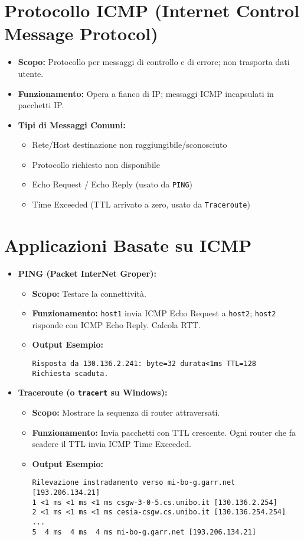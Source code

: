 \section{Protocollo ICMP (Internet Control Message Protocol)}
\begin{itemize}
    \item \textbf{Scopo:} Protocollo per messaggi di controllo e di errore; non trasporta dati utente.
    \item \textbf{Funzionamento:} Opera a fianco di IP; messaggi ICMP incapsulati in pacchetti IP.
    \item \textbf{Tipi di Messaggi Comuni:}
    \begin{itemize}
        \item Rete/Host destinazione non raggiungibile/sconosciuto
        \item Protocollo richiesto non disponibile
        \item Echo Request / Echo Reply (usato da \texttt{PING})
        \item Time Exceeded (TTL arrivato a zero, usato da \texttt{Traceroute})
    \end{itemize}
\end{itemize}

\section{Applicazioni Basate su ICMP}
\begin{itemize}
    \item \textbf{PING (Packet InterNet Groper):}
    \begin{itemize}
        \item \textbf{Scopo:} Testare la connettività.
        \item \textbf{Funzionamento:} \texttt{host1} invia ICMP Echo Request a \texttt{host2}; \texttt{host2} risponde con ICMP Echo Reply. Calcola RTT.
        \item \textbf{Output Esempio:}
\begin{verbatim}
Risposta da 130.136.2.241: byte=32 durata<1ms TTL=128
Richiesta scaduta.
\end{verbatim}
    \end{itemize}
    \item \textbf{Traceroute (o \texttt{tracert} su Windows):}
    \begin{itemize}
        \item \textbf{Scopo:} Mostrare la sequenza di router attraversati.
        \item \textbf{Funzionamento:} Invia pacchetti con TTL crescente. Ogni router che fa scadere il TTL invia ICMP Time Exceeded.
        \item \textbf{Output Esempio:}
\begin{verbatim}
Rilevazione instradamento verso mi-bo-g.garr.net [193.206.134.21]
1 <1 ms <1 ms <1 ms csgw-3-0-5.cs.unibo.it [130.136.2.254]
2 <1 ms <1 ms <1 ms cesia-csgw.cs.unibo.it [130.136.254.254]
...
5  4 ms  4 ms  4 ms mi-bo-g.garr.net [193.206.134.21]
\end{verbatim}
    \end{itemize}
\end{itemize}


